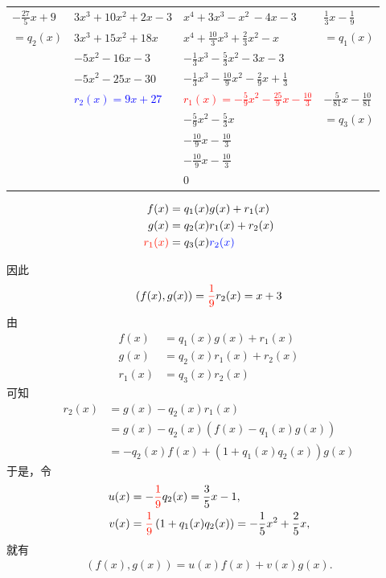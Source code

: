 \documentclass[13pt,fontset=mac]{ctexbeamer}
\newcommand{\blue}{\textcolor{blue}}
\newcommand{\red}{\textcolor{red}}
\begin{document}
\begin{frame}
	\begin{center}
				\renewcommand\arraystretch{1.2}
		\begin{tabular}{R{1.5cm}|R{3cm} |R{4cm}|L{1.7cm}}
			$-\frac{27}{5}x+9$ &{$3x^3+10x^2+2x-3$}&{$x^4+3x^3-x^2\, -4x-3$}&$\frac{1}{3}x-\frac{1}{9}$\\
			$=q_2(x)$ & $3x^3+15x^2+18x\quad $ & $x^4+\frac{10}{3}x^3+\frac{2}{3}x^2-x\qquad $& $=q_1(x)$\\
			&$ -5x^2-16x-3$ & $-\frac{1}{3}x^3-\frac{5}{3}x^2-3x-3\, $ & \\
			&$ -5x^2-25x-30$ & $-\frac{1}{3}x^3-\frac{10}{9}x^2-\frac{2}{9}x+\frac{1}{3}$ & \\
			&\blue{$r_2(x) = 9x+27$} & \red{$r_1(x) =-\frac{5}{9}x^2-\frac{25}{9}x-\frac{10}{3}$} & $-\frac{5}{81}x-\frac{10}{81}$\\
			& & $-\frac{5}{9}x^2-\frac{5}{3}x$ & $=q_3(x)$\\
			& & $-\frac{10}{9}x-\frac{10}{3}$ & \\
			& & $-\frac{10}{9}x-\frac{10}{3}$ & \\
			& & 0 & \\
		\end{tabular}
	\end{center}

	\begin{align*}
		{f(x)} & =q_1(x) {g(x)} +r_1(x)\\
		{g(x)} & =q_2(x) {r_1(x)} +r_2(x)\\
		\red{r_1(x)} & = q_3(x) \blue{r_2(x)}
	\end{align*}



\end{frame}

\begin{frame}
因此
    $$(f(x), g(x))=\red{\frac{1}{9}}r_2(x)= x+3$$
由\begin{align*}
        {f(x)} & =q_1(x) {g(x)} +r_1(x)\\
        {g(x)} & =q_2(x) {r_1(x)} +r_2(x)\\
        {r_1(x)} & = q_3(x) {r_2(x)}
    \end{align*}
可知
\begin{align*}
r_2(x)  & ={g(x)} - q_2(x) {r_1(x)} \\
 & ={g(x)} - q_2(x) \left(   {f(x)} - q_1(x) {g(x)}  \right)  \\
 & = - q_2(x) {f(x)} + \left(  1+  q_1(x)  q_2(x)   \right)  {g(x)}
\end{align*}
于是，令
\begin{align*}
u(x) & =  - \red{\frac{1}{9}} q_2(x) = \frac{3}{5} x-1,\\
v(x) & =\red{\frac{1}{9}} \left(  1+  q_1(x)  q_2(x)   \right) =  -\frac{1}{5} x^{2}+\frac{2}{5} x,
\end{align*}
就有
\begin{align*}
(f(x), g(x))=u(x) f(x)+v(x) g(x) .
\end{align*}


\end{frame}
\end{document}
